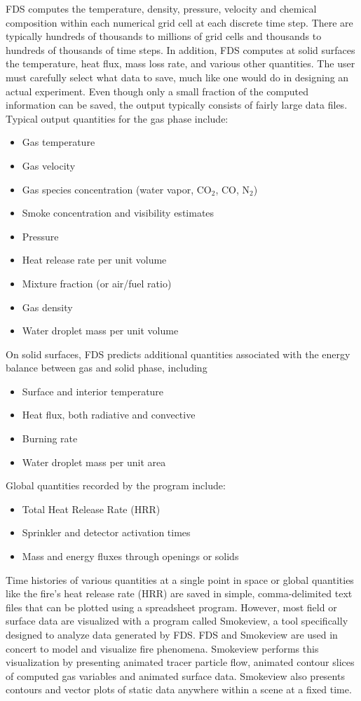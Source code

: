 \documentclass[11pt]{book}
\begin{document}
FDS computes the temperature, density, pressure, velocity and chemical composition within each numerical
grid cell at each discrete time step. There are typically hundreds of thousands to millions of grid
cells and thousands to hundreds of thousands of time steps. In addition, FDS computes at solid surfaces
the temperature, heat flux, mass loss rate, and various other quantities. The user must carefully select what
data to save, much like one would do in designing an actual experiment. Even though only a small fraction of
the computed information can be saved, the output typically consists of fairly large data files. Typical
output quantities for the gas phase include:
\begin{itemize}
\setlength{\itemsep}{0.0in}
\item Gas temperature
\item Gas velocity
\item Gas species concentration (water vapor, CO$_2$, CO, N$_2$)
\item Smoke concentration and visibility estimates
\item Pressure
\item Heat release rate per unit volume
\item Mixture fraction (or air/fuel ratio)
\item Gas density
\item Water droplet mass per unit volume
\end{itemize}
On solid surfaces, FDS predicts additional quantities associated with the energy balance between
gas and solid phase, including
\begin{itemize}
\setlength{\itemsep}{0.0in}
\item Surface and interior temperature
\item Heat flux, both radiative and convective
\item Burning rate
\item Water droplet mass per unit area
\end{itemize}
Global quantities recorded by the program include:
\begin{itemize}
\setlength{\itemsep}{0.0in}
\item Total Heat Release Rate (HRR)
\item Sprinkler and detector activation times
\item Mass and energy fluxes through openings or solids
\end{itemize}
Time histories of various quantities at a single point in space or global
quantities like the fire's heat release rate (HRR) are saved in simple, comma-delimited text files that
can be plotted using a spreadsheet program.
However, most field or surface data are visualized with a program called Smokeview, a tool specifically
designed to analyze data generated by FDS. FDS and Smokeview are used in concert to model and visualize fire phenomena.
Smokeview performs this visualization by presenting animated tracer particle flow,
animated contour slices of computed gas variables and animated surface data.
Smokeview also presents contours and vector plots of static data anywhere
within a scene at a fixed time.
\end{document}
